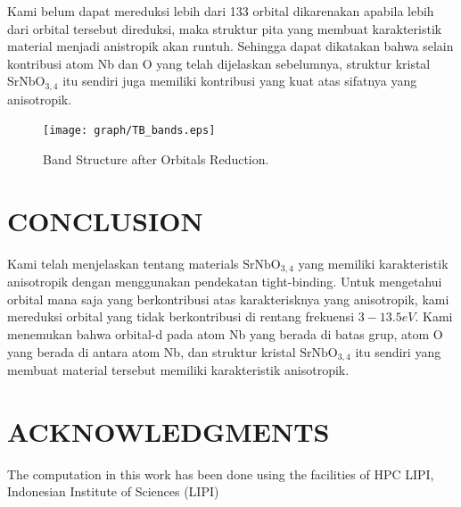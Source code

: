 \documentclass{aip-cp}
\begin{document}
Kami belum dapat mereduksi lebih dari 133 orbital dikarenakan apabila lebih dari orbital tersebut direduksi, maka struktur pita yang membuat karakteristik material menjadi anistropik akan runtuh. Sehingga dapat dikatakan bahwa selain kontribusi atom Nb dan O yang telah dijelaskan sebelumnya, struktur kristal $\mathrm{SrNbO_{3,4}}$ itu sendiri juga memiliki kontribusi yang kuat atas sifatnya yang anisotropik.

\begin{figure}[b]
  \centerline{\texttt{[image: graph/TB\_bands.eps]}}
  \caption{Band Structure after Orbitals Reduction.}
\end{figure}

\section{CONCLUSION}
Kami telah menjelaskan tentang materials $\mathrm{SrNbO_{3,4}}$ yang memiliki karakteristik anisotropik dengan menggunakan pendekatan tight-binding. Untuk mengetahui orbital mana saja yang berkontribusi atas karakterisknya yang anisotropik, kami mereduksi orbital yang tidak berkontribusi di rentang frekuensi $3-13.5 eV$. Kami menemukan bahwa orbital-d pada atom Nb yang berada di batas grup, atom O yang berada di antara atom Nb, dan struktur kristal $\mathrm{SrNbO_{3,4}}$ itu sendiri yang membuat material tersebut memiliki karakteristik anisotropik.


\section{ACKNOWLEDGMENTS}
The computation in this work has been done using the facilities of HPC LIPI,
Indonesian Institute of Sciences (LIPI)


\nocite{*}
%
%
\end{document}
